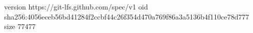 version https://git-lfs.github.com/spec/v1
oid sha256:4056eceb56bd41284f2ccbf44c26f354d470a769f86a3a5136b4f110ce78d777
size 77477
